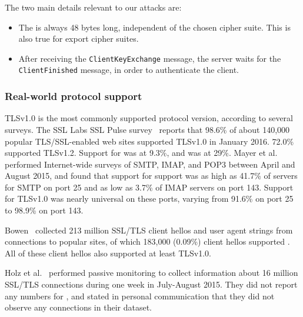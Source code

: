 The two main details relevant to our attacks are:
\begin{itemize}
	\item The \pms is always 48 bytes long, independent of the chosen cipher suite.  This is also true for export cipher suites.
	\item After receiving the \texttt{ClientKeyExchange} message, the server waits for the \texttt{ClientFinished} message, in order to authenticate the client.
\end{itemize}


\ifsubmit\relax\else
\subsubsection{Real-world protocol support}
TLSv1.0 is the most commonly supported protocol version, according to several surveys.  The SSL Labs SSL Pulse survey~\cite{ssllabs} reports that 98.6\% of about 140,000 popular TLS/SSL-enabled web sites supported TLSv1.0 in January 2016.  72.0\% supported TLSv1.2.  Support for \ssltwo was at 9.3\%, and \sslthree was at 29\%. Mayer et al.~\cite{DBLP:journals/corr/MayerZSH15} performed Internet-wide surveys of SMTP, IMAP, and POP3 between April and August 2015, and found that support for \ssltwo support was as high as 41.7\% of servers for SMTP on port 25 and as low as 3.7\% of IMAP servers on port 143.  Support for TLSv1.0 was nearly universal on these ports, varying from 91.6\% on port 25 to 98.9\% on port 143.

Bowen~\cite{bowencab} collected 213 million SSL/TLS client hellos and user agent strings from connections to popular sites, of which 183,000 (0.09\%) client hellos supported \ssltwo.  All of these client hellos also supported at least TLSv1.0.

Holz et al.~\cite{2016holz_analysis_tls-based_protocols_electronic_communication} performed passive monitoring to collect information about 16 million SSL/TLS connections during one week in July-August 2015.  They did not report any numbers for \ssltwo, and stated in personal communication that they did not observe any \ssltwo connections in their dataset.
\fi



